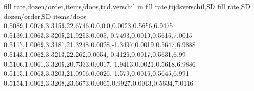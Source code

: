 fill rate,dozen/order,items/doos,tijd,verschil in fill rate,tijdsverschil,SD fill rate,SD dozen/order,SD items/doos
0.5089,1.0076,3.3159,22.6746,0.0,0.0,0.0023,0.5656,6.9475
0.5139,1.0063,3.3205,21.9253,0.005,-0.7493,0.0019,0.5616,7.0015
0.5117,1.0069,3.3187,21.3248,0.0028,-1.3497,0.0019,0.5647,6.9888
0.5143,1.0062,3.3213,22.262,0.0054,-0.4126,0.0017,0.5631,6.99
0.5106,1.0061,3.3206,20.7333,0.0017,-1.9413,0.0021,0.5618,6.9886
0.5115,1.0063,3.3203,21.0956,0.0026,-1.579,0.0016,0.5645,6.991
0.5154,1.0062,3.3208,23.6673,0.0065,0.9927,0.0013,0.5634,7.0116
